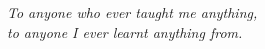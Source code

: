 \thispagestyle{empty}
\begin{flushright}
\null{}
\textit{To anyone who ever taught me anything,\\
        to anyone I ever learnt anything from.}
\null
\end{flushright}
